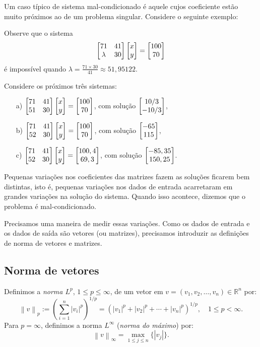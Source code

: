 Um caso típico de sistema mal-condicionado é aquele cujos coeficiente estão muito próximos ao de um problema singular. Considere o seguinte exemplo:

\begin{ex}\label{ex:sist-mal-cond} Observe que o sistema
\begin{equation}
\begin{bmatrix} 71&41\\\lambda&30 \end{bmatrix}\begin{bmatrix} x \\y \end{bmatrix}=\begin{bmatrix} 100 \\70 \end{bmatrix}
\end{equation}
é impossível quando $\lambda= \frac{71\times 30}{41}\approx 51,95122$.

Considere os próximos três sistemas:
\begin{enumerate}
 \item [a)] $\begin{bmatrix} 71&41\\51&30 \end{bmatrix}\begin{bmatrix} x \\y \end{bmatrix}=\begin{bmatrix} 100 \\70 \end{bmatrix}$, com solução $\begin{bmatrix} 10/3 \\-10/3 \end{bmatrix}$,
 \item [b)] $\begin{bmatrix} 71&41\\52&30 \end{bmatrix}\begin{bmatrix} x \\y \end{bmatrix}=\begin{bmatrix} 100 \\70 \end{bmatrix}$, com solução $\begin{bmatrix} -65 \\115 \end{bmatrix}$,
 \item [c)] $\begin{bmatrix} 71&41\\52&30 \end{bmatrix}\begin{bmatrix} x \\y \end{bmatrix}=\begin{bmatrix} 100,4 \\69,3 \end{bmatrix}$, com solução $\begin{bmatrix} -85,35 \\150,25 \end{bmatrix}$.
\end{enumerate}

Pequenas variações nos coeficientes das matrizes fazem as soluções ficarem bem distintas, isto é, pequenas variações nos dados de entrada acarretaram em grandes variações na solução do sistema. Quando isso acontece, dizemos que o problema é mal-condicionado.
\end{ex}

Precisamos uma maneira de medir essas variações. Como os dados de entrada e os dados de saída são vetores (ou matrizes), precisamos introduzir as definições de norma de vetores e matrizes.

\subsection{Norma de vetores}

Definimos a \emph{norma $L^p$}, $1 \leq p \leq \infty$, de um vetor em $v = (v_1, v_2, \ldots, v_n)\in \mathbb{R}^n$ por:
\begin{equation}
  \left\|v\right\|_p := \left(\sum_{i=1}^n \left |v_i\right |^p\right)^{1/p} = \left(\left |v_1\right |^p+\left |v_2\right |^p+ \cdots +\left |v_n\right |^p\right)^{1/p},\quad 1\leq p < \infty.
\end{equation}
Para $p=\infty$, definimos a norma $L^{\infty}$ (\emph{norma do máximo}) por:
\begin{equation}
  \left\|v\right\|_\infty = \max_{1\leq j\leq n} \{\left |v_j\right |\}.
\end{equation}

